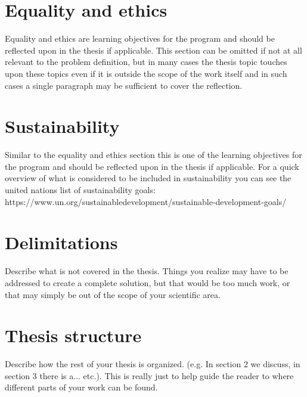 \section{Equality and ethics}
Equality and ethics are learning objectives for the program and should be reflected upon in the thesis if applicable. This section can be omitted if not at all relevant to the problem definition, but in many cases the thesis topic touches upon these topics even if it is outside the scope of the work itself and in such cases a single paragraph may be sufficient to cover the reflection.
\section{Sustainability}
Similar to the equality and ethics section this is one of the learning objectives for the program and should be reflected upon in the thesis if applicable. For a quick overview of what is considered to be included in sustainability you can see the united nations list of sustainability goals: https://www.un.org/sustainabledevelopment/sustainable-development-goals/
\section{Delimitations}
Describe what is not covered in the thesis. Things you realize may have to be addressed to create a complete solution, but that would be too much work, or that may simply be out of the scope of your scientific area.
\section{Thesis structure}
Describe how the rest of your thesis is organized. (e.g. In section 2 we discuss, in section 3 there is a... etc.). This is really just to help guide the reader to where different parts of your work can be found.
